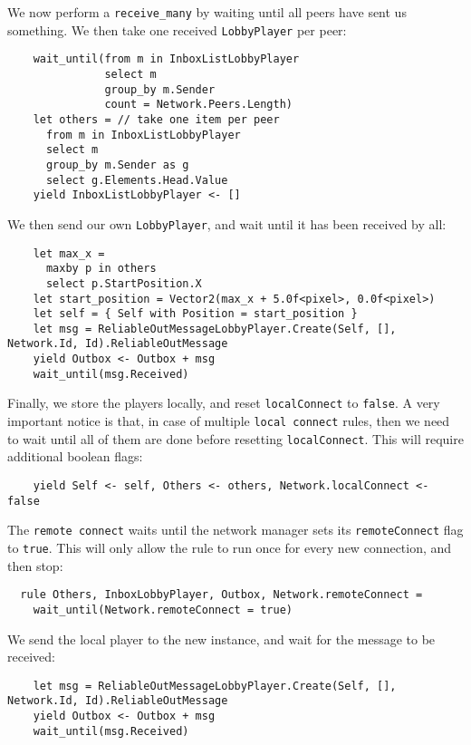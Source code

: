 We now perform a \texttt{receive\_many} by waiting until all peers have sent us something. We then take one received \texttt{LobbyPlayer} per peer:

\begin{lstlisting}
    wait_until(from m in InboxListLobbyPlayer
               select m
               group_by m.Sender
               count = Network.Peers.Length)
    let others = // take one item per peer
      from m in InboxListLobbyPlayer
      select m
      group_by m.Sender as g
      select g.Elements.Head.Value
    yield InboxListLobbyPlayer <- []
\end{lstlisting}

We then send our own \texttt{LobbyPlayer}, and wait until it has been received by all:

\begin{lstlisting}
    let max_x = 
      maxby p in others
      select p.StartPosition.X
    let start_position = Vector2(max_x + 5.0f<pixel>, 0.0f<pixel>)
    let self = { Self with Position = start_position }
    let msg = ReliableOutMessageLobbyPlayer.Create(Self, [], Network.Id, Id).ReliableOutMessage
    yield Outbox <- Outbox + msg
    wait_until(msg.Received)
\end{lstlisting}

Finally, we store the players locally, and reset \texttt{localConnect} to \texttt{false}. A very important notice is that, in case of multiple \texttt{local connect} rules, then we need to wait until all of them are done before resetting \texttt{localConnect}. This will require additional boolean flags:

\begin{lstlisting}
    yield Self <- self, Others <- others, Network.localConnect <- false
\end{lstlisting}

The \texttt{remote connect} waits until the network manager sets its \texttt{remoteConnect} flag to \texttt{true}. This will only allow the rule to run once for every new connection, and then stop:

\begin{lstlisting}
  rule Others, InboxLobbyPlayer, Outbox, Network.remoteConnect =
    wait_until(Network.remoteConnect = true)
\end{lstlisting}

We send the local player to the new instance, and wait for the message to be received:

\begin{lstlisting}
    let msg = ReliableOutMessageLobbyPlayer.Create(Self, [], Network.Id, Id).ReliableOutMessage
    yield Outbox <- Outbox + msg
    wait_until(msg.Received)
\end{lstlisting}

